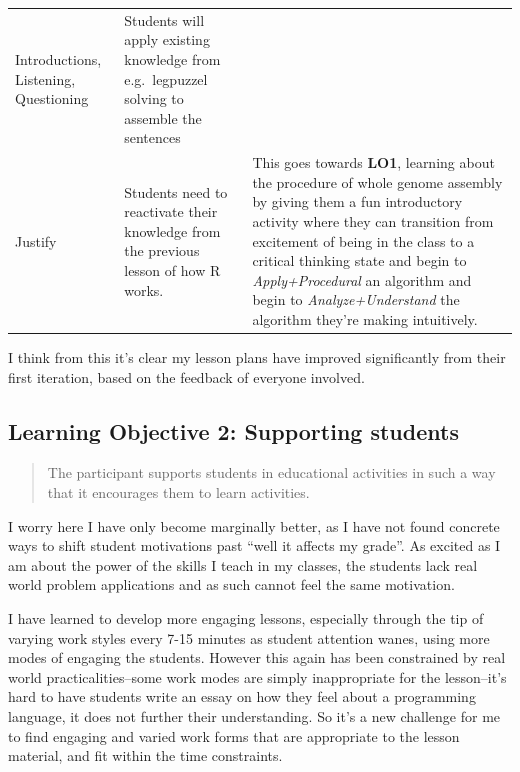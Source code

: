 \documentclass[paper=a4,justified,a4paper]{tufte-handout}
\begin{document}
\begin{longtable}[]{@{}lll@{}}
\begin{minipage}[t]{0.28\columnwidth}
Introductions, Listening, Questioning\strut
\end{minipage} & \begin{minipage}[t]{0.42\columnwidth}\raggedright
Students will apply existing knowledge from e.g.~legpuzzel solving to
assemble the sentences\strut
\end{minipage}\tabularnewline
\begin{minipage}[t]{0.21\columnwidth}\raggedright
Justify\strut
\end{minipage} & \begin{minipage}[t]{0.28\columnwidth}\raggedright
Students need to reactivate their knowledge from the previous lesson of
how R works.\strut
\end{minipage} & \begin{minipage}[t]{0.42\columnwidth}\raggedright
This goes towards \textbf{LO1}, learning about the procedure of whole
genome assembly by giving them a fun introductory activity where they
can transition from excitement of being in the class to a critical
thinking state and begin to \emph{Apply+Procedural} an algorithm and
begin to \emph{Analyze+Understand} the algorithm they're making
intuitively.\strut
\end{minipage}\tabularnewline
\bottomrule
\end{longtable}

I think from this it's clear my lesson plans have improved significantly
from their first iteration, based on the feedback of everyone involved.

\hypertarget{learning-objective-2-supporting-students}{%
\subsection{Learning Objective 2: Supporting
students}\label{learning-objective-2-supporting-students}}

\begin{quote}
The participant supports students in educational activities in such a
way that it encourages them to learn activities.
\end{quote}

I worry here I have only become marginally better, as I have not found
concrete ways to shift student motivations past ``well it affects my
grade''. As excited as I am about the power of the skills I teach in my
classes, the students lack real world problem applications and as such
cannot feel the same motivation.

I have learned to develop more engaging lessons, especially through the
tip of varying work styles every 7-15 minutes as student attention
wanes, using more modes of engaging the students. However this again has
been constrained by real world practicalities--some work modes are
simply inappropriate for the lesson--it's hard to have students write an
essay on how they feel about a programming language, it does not further
their understanding. So it's a new challenge for me to find engaging and
varied work forms that are appropriate to the lesson material, and fit
within the time constraints.
\end{document}
